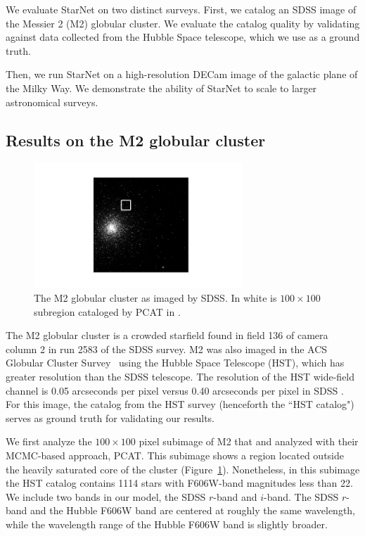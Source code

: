 We evaluate StarNet on two distinct surveys. First, we catalog an SDSS image of the Messier 2 (M2) globular cluster. 
We evaluate the catalog quality by validating against data collected from 
the Hubble Space telescope, which we use as a ground truth. 

Then, we run StarNet on a high-resolution DECam image of the galactic plane of the Milky Way. 
We demonstrate the ability of StarNet to scale to larger astronomical surveys.

\subsection{Results on the M2 globular cluster}
\label{sec:results_on_m2}

\begin{figure}[tb]
    \centering
    \includegraphics[width=0.7\textwidth]{figures/m2_results/m2_regions.png}
    \vspace{-1cm}
    \caption{The M2 globular cluster as imaged by SDSS. In white is $100 \times 100$ subregion 
    cataloged by PCAT in \cite{Feder_2019}. }
    \label{fig:m2_region}
\end{figure}

The M2 globular cluster is a crowded starfield found in field 136 of camera column 2 in run 2583 of the SDSS survey. 
M2 was also imaged in the ACS Globular Cluster Survey~\citep{Sarajedini_2007}
using the Hubble Space Telescope (HST),
which has greater resolution than the SDSS telescope.
The resolution of the HST wide-field channel is 0.05 arcseconds per pixel versus
0.40 arcseconds per pixel in SDSS \citep{hubble_about, sdss_about}.
For this image, the catalog from the HST survey (henceforth the ``HST catalog")
serves as ground truth for validating our results.

We first analyze the $100 \times 100$ pixel subimage of M2 that
\cite{Portillo_2017} and \cite{Feder_2019} analyzed with their MCMC-based approach, PCAT.
This subimage shows a region located outside the heavily saturated core of the cluster (Figure~\ref{fig:m2_region}). 
Nonetheless, in this subimage the HST catalog contains 1114 stars with F606W-band magnitudes less than 22.
We include two bands in our model, the SDSS $r$-band and $i$-band.
The SDSS $r$-band and the Hubble F606W band are centered at roughly the same wavelength,
while the wavelength range of the Hubble F606W band is slightly broader.

